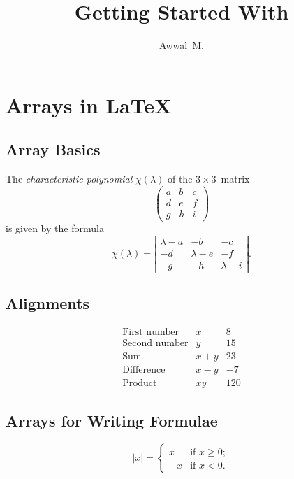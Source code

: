\documentclass[a4paper,12pt]{article}
\begin{document}
\title{Getting Started With \LaTeXe{}}
\author{Awwal~M.}
\maketitle

\section{Arrays in \LaTeX{}}

\subsection{Array Basics}
The \emph{characteristic polynomial} $\chi(\lambda)$ of the $3 \times 3$~matrix
\[ \left(
 \begin{array}{ccc}
    a & b & c \\
    d & e & f \\
    g & h & i
 \end{array}
\right)\]
is given by the formula
\[ \chi(\lambda) = \left|
   \begin{array}{ccc}
      \lambda - a & -b & -c \\
       -d & \lambda - e & -f \\
       -g & -h & \lambda - i
   \end{array}
\right| .\]

\subsection{Alignments}
\[ \begin{array}{lcr} 
   \mbox{First number} & x & 8 \\ 
   \mbox{Second number} & y & 15 \\ 
   \mbox{Sum} & x + y & 23 \\ 
   \mbox{Difference} & x - y & -7 \\ 
   \mbox{Product} & xy & 120 
\end{array}\]

\subsection{Arrays for Writing Formulae}
\[ |x| = \left\{ 
    \begin{array}{ll}
        x & \mbox{if $x \geq 0$};\\
        -x & \mbox{if $x < 0$}.
    \end{array}
\right. \]
\end{document}
